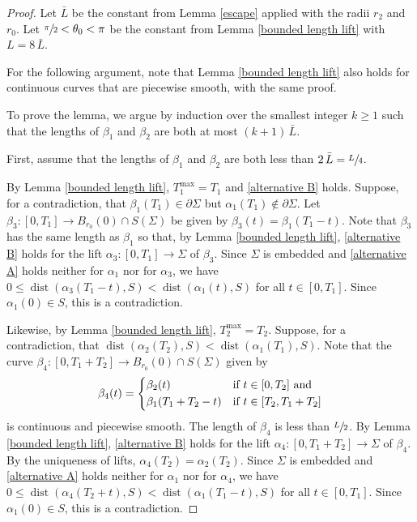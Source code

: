 \documentclass[11pt]{amsart}
\begin{document}
	\begin{proof}
		Let $\bar L$ be the constant from Lemma \ref{escape} applied with the radii $r_2$ and $r_0$. Let $\sfrac{\pi}2<\theta_0<\pi$ be the constant from Lemma \ref{bounded length lift} with $L=8\, \bar L$. 
		
		For the following argument,  note that Lemma \ref{bounded length lift} also holds  for continuous  curves that are piecewise smooth, with the same proof.
		
		To prove the lemma, we argue by induction over the smallest integer $k\geq 1$  such that the lengths of  $\beta_1$ and $\beta_2$ are both at most $(k+1)\,\bar L$. 
		
	First,   assume that the lengths of $\beta_1$ and $\beta_2$ are both less than $2\,\bar L= \sfrac{L}4$. 
	
 By Lemma \ref{bounded length lift}, $T^{\max}_1=T_1$ and \eqref{alternative B} holds.  Suppose, for a contradiction, that $\beta_1( T_1)\in \partial\Sigma$ but $\alpha_1(T_1)\notin\partial \Sigma$. Let $ \beta_3:[0, T_1]\to B_{r_0}(0)\cap S(\Sigma)$ be given by $ \beta_3(t)=\beta_1(T_1-t)$. Note that $\beta_3$ has the same length as $\beta_1$ so that, by Lemma \ref{bounded length lift}, \eqref{alternative B} holds for the lift $ \alpha_3:[0,T_1]\to \Sigma$ of $\beta_3$.  
  Since $\Sigma$ is embedded and \eqref{alternative A} holds neither for $\alpha_1$ nor for $\alpha_3$, we have $0\leq \operatorname{dist}(\alpha_3( T_1-t),S)<\operatorname{dist}(\alpha_1(t),S)$ for all $t\in[0, T_1]$. Since $\alpha_1(0)\in S$, this is a contradiction.
		
			Likewise, by Lemma \ref{bounded length lift}, $T^{\max}_2=T_2$.  Suppose, for a contradiction, that $\operatorname{dist}(\alpha_2(T_2),S)<\operatorname{dist}(\alpha_1(T_1),S)$. Note that the curve $\beta_4:[0, T_1+ T_2]\to B_{r_0}(0)\cap S(\Sigma)$ given by 
			$$\beta_4(t)=\begin{dcases} \beta_2(t)\qquad&\text{if $t\in[0, T_2]$ and}\\ \beta_1(T_1+T_2-t)&\text{if $t\in[T_2,T_1+T_2]$}
			\end{dcases}
			$$ is continuous and piecewise smooth. The  length of $\beta_4$ is less than $\sfrac{L}{2}$. By Lemma \ref{bounded length lift}, \eqref{alternative B} holds for the lift $ \alpha_4:[0,T_1+T_2]\to \Sigma$  of $ \beta_4$.  By the uniqueness of lifts, $\alpha_4(T_2)=\alpha_2(T_2)$. Since $\Sigma$ is embedded and \eqref{alternative A} holds neither for $\alpha_1$ nor for $\alpha_4$, we have $0\leq \operatorname{dist}(\alpha_4(T_2+t),S)<\operatorname{dist}(\alpha_1(T_1-t),S)$ for all $t\in[0,T_1]$. Since $\alpha_1(0)\in S$, this is a contradiction.
			

\end{proof}
\end{document}
